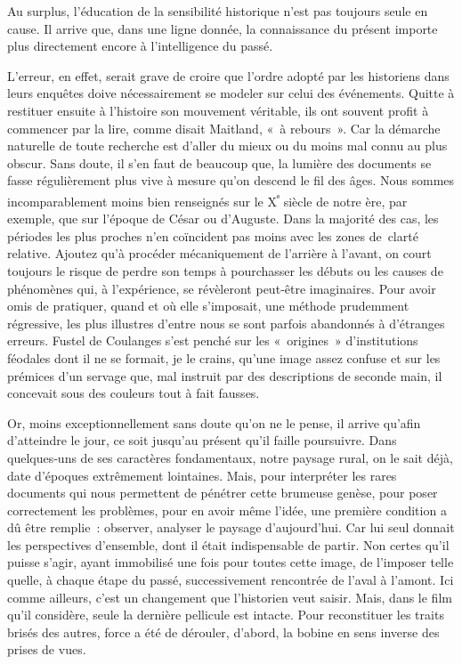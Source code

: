 \documentclass[french,twoside]{book} %
\newcommand{\astermono}{\medskip\centerline{\color{rubric}\large\selectfont{\syms ✻}}\medskip\par}%
\begin{document}
\astermono

\noindent Au surplus, l’éducation de la sensibilité historique n’est pas toujours seule en cause. Il arrive que, dans une ligne donnée, la connaissance du présent importe plus directement encore à l’intelligence du passé.\par
L’erreur, en effet, serait grave de croire que l’ordre adopté par les historiens dans leurs enquêtes doive nécessairement se modeler sur celui des événements. Quitte à restituer ensuite à l’histoire son mouvement véritable, ils ont souvent profit à commencer par la lire, comme disait Maitland, « à rebours ». Car la démarche naturelle de toute recherche est d’aller du mieux ou du moins mal connu au plus obscur. Sans doute, il s’en faut de beaucoup que, la lumière des documents se fasse régulièrement plus vive à mesure qu’on descend le fil des âges. Nous sommes incomparablement moins bien renseignés sur le X\textsuperscript{ᵉ} siècle de notre ère, par exemple, que sur l’époque de César ou d’Auguste. Dans la majorité des cas, les périodes les plus proches n’en coïncident pas moins avec les zones de clarté relative. Ajoutez qu’à procéder mécaniquement de l’arrière à l’avant,  
\label{p15} on court toujours le risque de perdre son temps à pourchasser les débuts ou les causes de phénomènes qui, à l’expérience, se révèleront peut‑être imaginaires. Pour avoir omis de pratiquer, quand et où elle s’imposait, une méthode prudemment régressive, les plus illustres d’entre nous se sont par­fois abandonnés à d’étranges erreurs. Fustel de Coulanges s’est penché sur les « origines » d’institutions féodales dont il ne se formait, je le crains, qu’une image assez confuse et sur les prémices d’un servage que, mal instruit par des descriptions de seconde main, il concevait sous des couleurs tout à fait fausses.\par
Or, moins exceptionnellement sans doute qu’on ne le pense, il arrive qu’afin d’atteindre le jour, ce soit jusqu’au présent qu’il faille poursuivre. Dans quelques‑uns de ses caractères fondamentaux, notre paysage rural, on le sait déjà, date d’époques extrêmement lointaines. Mais, pour inter­préter les rares documents qui nous permettent de pénétrer cette brumeuse genèse, pour poser correctement les problèmes, pour en avoir même l’idée, une première condition a dû être remplie : observer, analyser le paysage d’aujourd’hui. Car lui seul donnait les perspectives d’ensemble, dont il était indispensable de partir. Non certes qu’il puisse s’agir, ayant immo­bilisé une fois pour toutes cette image, de l’imposer telle quelle, à chaque étape du passé, successivement rencontrée de l’aval à l’amont. Ici comme ailleurs, c’est un changement que l’historien veut saisir. Mais, dans le film qu’il considère, seule la dernière pellicule est intacte. Pour reconstituer les traits brisés des autres, force a été de dérouler, d’abord, la bobine en sens inverse des prises de vues.\par
\end{document}
